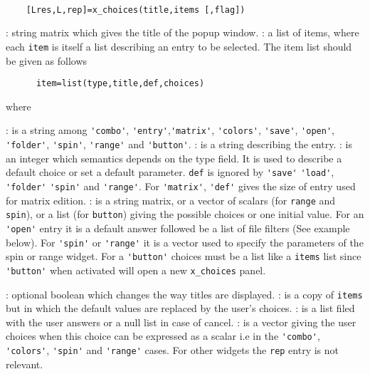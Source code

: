 \begin{mandesc}
  \\ %
\end{mandesc}
\begin{calling_sequence}
  \begin{verbatim}
    [Lres,L,rep]=x_choices(title,items [,flag])   
  \end{verbatim}
\end{calling_sequence}
\begin{parameters}
  \begin{varlist}
    : string matrix which gives the title of the popup window.
    : a list of items, where each \verb!item! is itself a list 
    describing an entry to be selected. The item list should be given as follows 
    \begin{verbatim}
      item=list(type,title,def,choices) 
    \end{verbatim} 
    where 
    \begin{varlist}
      : is a string among \verb+'combo'+, \verb+'entry'+,\verb+'matrix'+, 
      \verb+'colors'+, \verb+'save'+, \verb+'open'+, \verb+'folder'+,  \verb+'spin'+, \verb+'range'+ and 
      \verb+'button'+.
    : is a string describing the entry. 
    : is an integer which semantics depends on the type field. It is used to describe a default choice or set 
      a default parameter. \verb+def+ is ignored by \verb+'save'+ 
      \verb+'load'+, \verb+'folder'+ \verb+'spin'+ and \verb+'range'+. 
      For \verb+'matrix'+, \verb+'def'+ gives the size of entry used for matrix edition.
    : is a string matrix, or a vector of scalars (for \verb+range+ and \verb+spin+),
    or a list (for \verb+button+) giving the possible choices or one initial value. For an 
      \verb+'open'+ entry it is a default answer followed be a list of file filters (See example below). For 
      \verb+'spin'+ or \verb+'range'+ it is a vector used to specify the parameters of the spin or range widget.
      For a \verb+'button'+ choices must be a list like a \verb+items+ list since \verb+'button'+ when activated 
      will open a new \verb+x_choices+ panel.
    \end{varlist}
    : optional boolean which changes the way titles are displayed. 
    : is a copy of \verb+items+ but in which the default values are replaced by the user's choices. 
    : is a list filed with the user answers or a null list in case of cancel.
    : is a vector giving the user choices when this choice can be expressed as a scalar 
    i.e in the \verb+'combo'+, \verb+'colors'+, \verb+'spin'+ and \verb+'range'+ cases. For other widgets 
    the \verb+rep+ entry is not relevant.
  \end{varlist}
\end{parameters}
